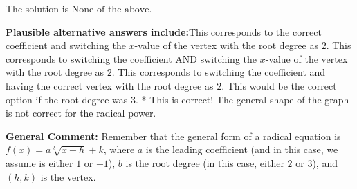 \documentclass{extbook}[14pt]
\begin{document}
\begin{enumerate}
{The solution is \( \text{None of the above} \).\begin{enumerate}[label=\Alph*.]
\textbf{Plausible alternative answers include:}This corresponds to the correct coefficient and switching the $x$-value of the vertex with the root degree as $2$.
This corresponds to switching the coefficient AND switching the $x$-value of the vertex with the root degree as $2$.
This corresponds to switching the coefficient and having the correct vertex with the root degree as $2$.
This would be the correct option if the root degree was $3$.
* This is correct! The general shape of the graph is not correct for the radical power.
\end{enumerate}

\textbf{General Comment:} Remember that the general form of a radical equation is $ f(x) = a \sqrt[b]{x - h} + k$, where $a$ is the leading coefficient (and in this case, we assume is either $1$ or $-1$), $b$ is the root degree (in this case, either $2$ or $3$), and $(h, k)$ is the vertex.
}
\end{enumerate}
\end{document}
